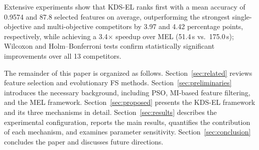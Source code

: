 Extensive experiments show that KDS-EL ranks first with a mean accuracy of 0.9574 and 87.8 selected features on average, outperforming the strongest single-objective and multi-objective competitors by 3.97 and 4.42 percentage points, respectively, while achieving a 3.4$\times$ speedup over MEL (51.4\,s vs.\ 175.0\,s); Wilcoxon and Holm--Bonferroni tests confirm statistically significant improvements over all 13 competitors.

The remainder of this paper is organized as follows. Section~\ref{sec:related} reviews feature selection and evolutionary FS methods. Section~\ref{sec:preliminaries} introduces the necessary background, including PSO, MI-based feature filtering, and the MEL framework. Section~\ref{sec:proposed} presents the KDS-EL framework and its three mechanisms in detail. Section~\ref{sec:results} describes the experimental configuration, reports the main results, quantifies the contribution of each mechanism, and examines parameter sensitivity. Section~\ref{sec:conclusion} concludes the paper and discusses future directions.
